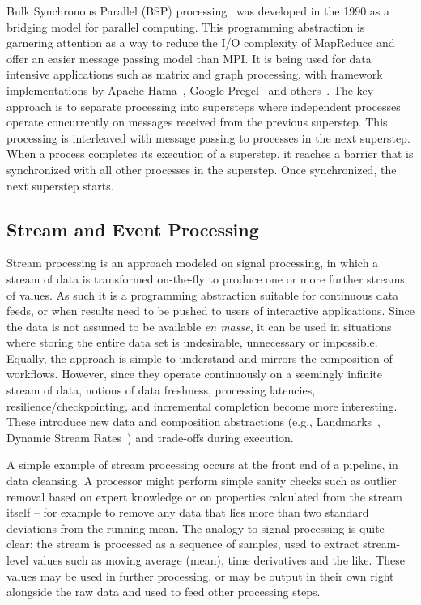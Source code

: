 Bulk Synchronous Parallel (BSP) processing~\cite{valiant1990bsp} was developed in the 1990 as a bridging model for
parallel computing. This programming abstraction is garnering attention as a way to reduce the I/O complexity of
MapReduce and offer an easier message passing model than MPI. It is being used for data intensive
applications such as matrix and graph processing, with framework implementations by Apache Hama~\cite{hama},
Google Pregel~\cite{pregel} and others~\cite{goldenorb}. The key approach is to separate processing into supersteps where independent
processes operate concurrently on messages received from the previous superstep. This processing is
interleaved with message passing to processes in the next superstep. When a process completes its
execution of a superstep, it reaches a barrier that is synchronized with all other processes in the
superstep. Once synchronized, the next superstep starts. 

\subsection{Stream and Event Processing}


Stream processing is an approach modeled on signal processing, in
which a stream of data is transformed on-the-fly to produce one or
more further streams of values. As such it is a programming abstraction suitable for
continuous data feeds, or when results need to be pushed to users of interactive applications. Since
the data is not assumed to be available 
\textit{en masse}, it can be used in situations where storing the
entire data set is undesirable, unnecessary or impossible. Equally,
the approach is simple to understand and mirrors the composition of workflows. However, since
they operate continuously on a seemingly infinite stream of data, notions of data freshness,
processing latencies, resilience/checkpointing, and incremental completion become more
interesting. These introduce new data and composition abstractions
(e.g., Landmarks~\cite{chandrasekaran:telegraphcq2003}, Dynamic Stream
Rates~\cite{Simmhan:sciencecloud:2011}) and trade-offs during execution.

A simple example of stream processing occurs at the front end of a
pipeline, in data cleansing. A processor might perform simple sanity
checks such as outlier removal based on expert knowledge or on
properties calculated from the stream itself -- for example to remove
any data that lies more than two standard deviations from the running
mean. The analogy to signal processing is quite clear: the stream is
processed as a sequence of samples, used to extract stream-level
values such as moving average (mean), time derivatives and the
like. These values may be used in further processing, or may be output
in their own right alongside the raw data and used to feed other
processing steps.


